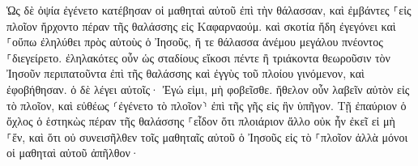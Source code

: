 \documentclass{openreader}
\begin{document}
Ὡς δὲ ὀψία ἐγένετο κατέβησαν οἱ μαθηταὶ αὐτοῦ ἐπὶ τὴν θάλασσαν, 
καὶ ἐμβάντες ⸀εἰς πλοῖον ἤρχοντο πέραν τῆς θαλάσσης εἰς Καφαρναούμ. καὶ σκοτία ἤδη ἐγεγόνει καὶ ⸀οὔπω ἐληλύθει πρὸς αὐτοὺς ὁ Ἰησοῦς, 
ἥ τε θάλασσα ἀνέμου μεγάλου πνέοντος ⸀διεγείρετο. 
ἐληλακότες οὖν ὡς σταδίους εἴκοσι πέντε ἢ τριάκοντα θεωροῦσιν τὸν Ἰησοῦν περιπατοῦντα ἐπὶ τῆς θαλάσσης καὶ ἐγγὺς τοῦ πλοίου γινόμενον, καὶ ἐφοβήθησαν. 
ὁ δὲ λέγει αὐτοῖς· Ἐγώ εἰμι, μὴ φοβεῖσθε. 
ἤθελον οὖν λαβεῖν αὐτὸν εἰς τὸ πλοῖον, καὶ εὐθέως ⸂ἐγένετο τὸ πλοῖον⸃ ἐπὶ τῆς γῆς εἰς ἣν ὑπῆγον. 
Τῇ ἐπαύριον ὁ ὄχλος ὁ ἑστηκὼς πέραν τῆς θαλάσσης ⸀εἶδον ὅτι πλοιάριον ἄλλο οὐκ ἦν ἐκεῖ εἰ μὴ ⸀ἕν, καὶ ὅτι οὐ συνεισῆλθεν τοῖς μαθηταῖς αὐτοῦ ὁ Ἰησοῦς εἰς τὸ ⸀πλοῖον ἀλλὰ μόνοι οἱ μαθηταὶ αὐτοῦ ἀπῆλθον· 
\end{document}
